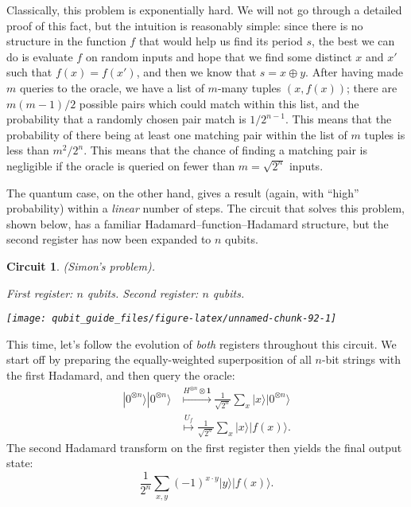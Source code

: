 \documentclass[fleqn]{article}
\newtheorem*{circuit}{Circuit}
\begin{document}
Classically, this problem is exponentially hard.
We will not go through a detailed proof of this fact, but the intuition is reasonably simple: since there is no structure in the function \(f\) that would help us find its period \(s\), the best we can do is evaluate \(f\) on random inputs and hope that we find some distinct \(x\) and \(x'\) such that \(f(x)=f(x')\), and then we know that \(s=x\oplus y\).
After having made \(m\) queries to the oracle, we have a list of \(m\)-many tuples \((x,f(x))\); there are \(m(m-1)/2\) possible pairs which could match within this list, and the probability that a randomly chosen pair match is \(1/2^{n-1}\).
This means that the probability of there being at least one matching pair within the list of \(m\) tuples is less than \(m^2/2^n\).
This means that the chance of finding a matching pair is negligible if the oracle is queried on fewer than \(m=\sqrt{2^n}\) inputs.

The quantum case, on the other hand, gives a result (again, with ``high'' probability) within a \emph{linear} number of steps.
The circuit that solves this problem, shown below, has a familiar Hadamard--function--Hadamard structure, but the second register has now been expanded to \(n\) qubits.

\begin{circuit}

(Simon's problem).

\emph{First register: \(n\) qubits. Second register: \(n\) qubits.}

\begin{center}\texttt{[image: qubit\_guide\_files/figure-latex/unnamed-chunk-92-1]} \end{center}

\end{circuit}

This time, let's follow the evolution of \emph{both} registers throughout this circuit.
We start off by preparing the equally-weighted superposition of all \(n\)-bit strings with the first Hadamard, and then query the oracle:
\[
  \begin{aligned}
    |0^{\otimes n}\rangle|0^{\otimes n}\rangle
    &\overset{H^{\otimes n}\otimes\mathbf{1}}{\longmapsto}
    \frac{1}{\sqrt{2^n}} \sum_x |x\rangle|0^{\otimes n}\rangle
  \\&\overset{U_f}{\longmapsto}
    \frac{1}{\sqrt{2^n}} \sum_x |x\rangle|f(x)\rangle.
  \end{aligned}
\]
The second Hadamard transform on the first register then yields the final output state:
\[
  \frac{1}{2^n} \sum_{x,y} (-1)^{x\cdot y} |y\rangle|f(x)\rangle.
\tag{$\ddagger$}
\]
\end{document}
